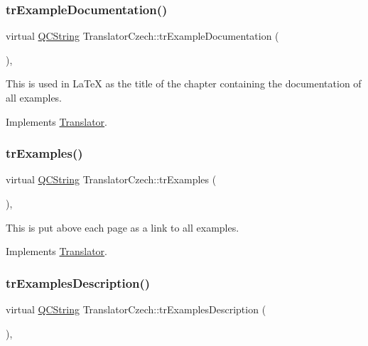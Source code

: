 \subsubsection{\texorpdfstring{trExampleDocumentation()}{trExampleDocumentation()}}
{\footnotesize\ttfamily virtual \mbox{\hyperlink{class_q_c_string}{Q\+C\+String}} Translator\+Czech\+::tr\+Example\+Documentation (\begin{DoxyParamCaption}{ }\end{DoxyParamCaption})\hspace{0.3cm}{\ttfamily [inline]}, {\ttfamily [virtual]}}

This is used in La\+TeX as the title of the chapter containing the documentation of all examples. 

Implements \mbox{\hyperlink{class_translator}{Translator}}.

\mbox{\label{class_translator_czech_aec2387a34264dc6e602bf2765ba797f8}} 
\subsubsection{\texorpdfstring{trExamples()}{trExamples()}}
{\footnotesize\ttfamily virtual \mbox{\hyperlink{class_q_c_string}{Q\+C\+String}} Translator\+Czech\+::tr\+Examples (\begin{DoxyParamCaption}{ }\end{DoxyParamCaption})\hspace{0.3cm}{\ttfamily [inline]}, {\ttfamily [virtual]}}

This is put above each page as a link to all examples. 

Implements \mbox{\hyperlink{class_translator}{Translator}}.

\mbox{\label{class_translator_czech_a2d627bd24c6e2bb8e5b489ac70e490f1}} 
\subsubsection{\texorpdfstring{trExamplesDescription()}{trExamplesDescription()}}
{\footnotesize\ttfamily virtual \mbox{\hyperlink{class_q_c_string}{Q\+C\+String}} Translator\+Czech\+::tr\+Examples\+Description (\begin{DoxyParamCaption}{ }\end{DoxyParamCaption})\hspace{0.3cm}{\ttfamily [inline]}, {\ttfamily [virtual]}}

